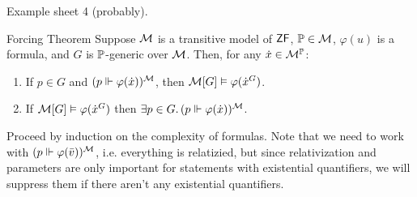 \documentclass{article}
\begin{document}
    \proof Example sheet 4 (probably). \endproof
    \newlec
    \begin{fancythm}{Forcing Theorem}
        Suppose $\mathcal{M}$ is a transitive model of $\mathsf{ZF}$, $\mathbb{P} \in \mathcal{M}$, $\varphi(u)$ is a formula, and $G$ is $\mathbb{P}$-generic over $\mathcal{M}$. Then, for any $\dot{x} \in \mathcal{M}^{\mathbb{P}}$: \begin{enumerate}
            \item[(i)] If $p \in G$ and $(p \Vdash \varphi(\dot{x}))^{\mathcal{M}}$, then $\mathcal{M}[G] \vDash \varphi(\dot{x}^{G})$.
            \item[(ii)] If $\mathcal{M}[G] \vDash \varphi(\dot{x}^{G})$ then $\exists p \in G. \, (p \Vdash \varphi(\dot{x}))^{\mathcal{M}}$.
        \end{enumerate}
    \end{fancythm}
    \proof
    Proceed by induction on the complexity of formulas. Note that we need to work with $(p \Vdash \varphi(\bar{v}))^{\mathcal{M}}$, i.e. everything is relatizied, but since relativization and parameters are only important for statements with existential quantifiers, we will suppress them if there aren't any existential quantifiers.
\end{document}
